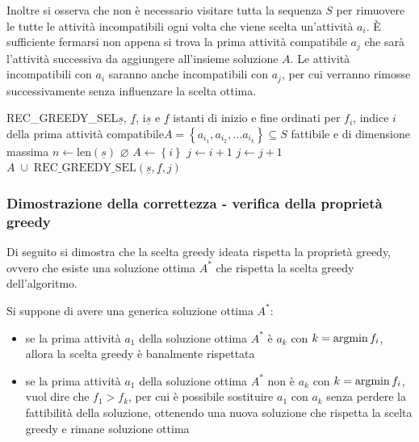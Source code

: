 Inoltre si osserva che non è necessario visitare tutta la sequenza \(S\) per rimuovere le tutte le attività incompatibili
ogni volta che viene scelta un'attività \(a_i\). È sufficiente fermarsi non appena si trova la prima attività compatibile
\(a_j\) che sarà l'attività successiva da aggiungere all'insieme soluzione \(A\). Le attività incompatibili con \(a_i\)
saranno anche incompatibili con \(a_j\), per cui verranno rimosse successivamente senza influenzare la scelta ottima.

\begin{algo}{REC\_GREEDY\_SEL}{$\underline{s}$, $\underline{f}$, i}{$\underline{s}$ e $\underline{f}$ istanti di inizio e fine ordinati per $f_i$, indice $i$ della prima attività compatibile}{$A = \left\{ a_{i_1}, a_{i_2}, \dots a_{i_k} \right\} \subseteq S$ fattibile e di dimensione massima}
	\State \(n \gets \text{len}(\underline{s})\)
	 \Return \(\varnothing\)  \EndIf
	\State \(A \gets \left\{ i \right\}\) 
	\State \(j \gets i + 1\)
	 \(j \gets j + 1\)  \EndWhile
	\State \Return \(A \; \cup \; \text{REC\_GREEDY\_SEL}(\underline{s}, \underline{f}, j)\) 
\end{algo}

\subsubsection*{Dimostrazione della correttezza - verifica della proprietà greedy}
Di seguito si dimostra che la scelta greedy ideata rispetta la proprietà greedy, ovvero che esiste una soluzione ottima
\(A^*\) che rispetta la scelta greedy dell'algoritmo.

Si suppone di avere una generica soluzione ottima \(A^*\):
\begin{itemize}
	\item se la prima attività \(a_1\) della soluzione ottima \(A^*\) è \(a_k\) con \(k = \operatorname*{argmin} f_i\), allora la scelta
	greedy è banalmente rispettata
	\item se la prima attività \(a_1\) della soluzione ottima \(A^*\) non è \(a_k\) con \(k = \operatorname*{argmin} f_i\), vuol dire che
	\(f_1 > f_k\), per cui è possibile sostituire \(a_1\) con \(a_k\) senza perdere la fattibilità della soluzione, ottenendo
	una nuova soluzione che rispetta la scelta greedy e rimane soluzione ottima
\end{itemize}

